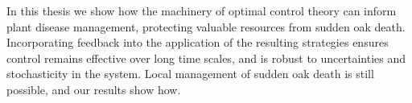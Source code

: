 In this thesis we show how the machinery of optimal control theory can inform plant disease management, protecting valuable resources from sudden oak death. Incorporating feedback into the application of the resulting strategies ensures control remains effective over long time scales, and is robust to uncertainties and stochasticity in the system. Local management of sudden oak death is still possible, and our results show how.